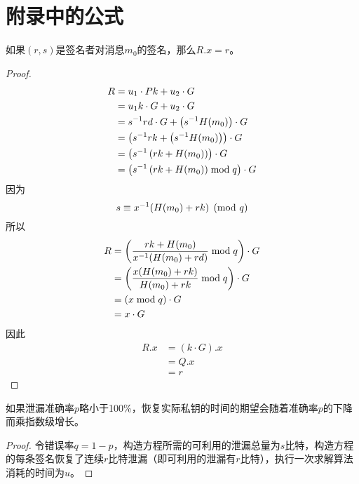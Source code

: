 \thispagestyle{appendixheader}
\setcounter{app_fig}{1}
\setcounter{app_tab}{1}
\setcounter{equation}{0}
\renewcommand\theequation{附\arabic{app}-\arabic{equation}}
\renewcommand\chaptername{附录}
\renewcommand\chaptername{Appendix} 
\renewcommand\thechapter{附录\zhnum{app}} 

\setcounter{chapter}{0}
\setcounter{section}{0}
\chapter{附录中的公式}\label{chap:app1}{
	\begin{proposition}\label{prop:ECDSA-authentication}
		如果$(r,s)$是签名者对消息$m_0$的签名，那么$R.x=r$。 
	\end{proposition}
	\begin{proof}
		\begin{align*}
			R&=u_1\cdot Pk+u_2\cdot G \\
			&= u_1k\cdot G+u_2\cdot G \\
			&= s^{-1}rd\cdot G+\left(s^{-1}H(m_0)\right)\cdot G \\
			&= \left(s^{-1}rk+\left(s^{-1}H(m_0)\right)\right)\cdot G \\
			&= \left(s^{-1}\left(rk+H(m_0)\right)\right)\cdot G \\
			&= \left(s^{-1}\left(rk+H(m_0)\right)\bmod q\right)\cdot G
		\end{align*}
		因为$$s\equiv x^{-1}(H(m_0)+rk) \pmod q$$
		所以\begin{align*}
			R&= \left(\frac{rk+H(m_0)}{x^{-1}(H(m_0)+rd)}\bmod q\right)\cdot G \\
			&= \left(\frac{x(H(m_0)+rk)}{H(m_0)+rk}\bmod q\right)\cdot G \\
			&= \left(x\bmod q\right)\cdot G \\
			&= x\cdot G
		\end{align*}
		因此\begin{align*}
			R.x&=\left(k\cdot G\right).x\\
			&=Q.x\\
			&=r
		\end{align*}
	\end{proof}
		
	\begin{proposition}\label{prop:expotime}
		如果泄漏准确率$p$略小于100\%，恢复实际私钥的时间的期望会随着准确率$p$的下降而乘指数级增长。
	\end{proposition}
	\begin{proof}
		令错误率$q=1-p$，构造方程所需的可利用的泄漏总量为$s$比特，构造方程的每条签名恢复了连续$r$比特泄漏（即可利用的泄漏有$r$比特），执行一次求解算法消耗的时间为$u$。
		

\end{proof}}
